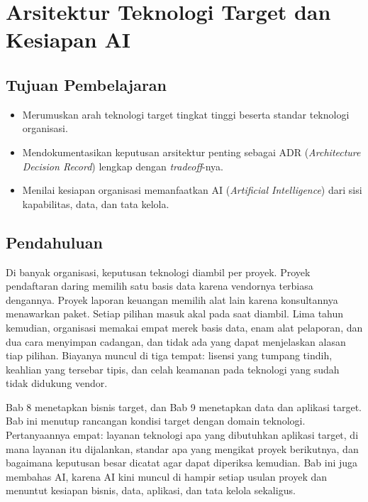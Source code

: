 \chapter{Arsitektur Teknologi Target dan Kesiapan AI}

\section*{Tujuan Pembelajaran}
\begin{itemize}
  \item Merumuskan arah teknologi target tingkat tinggi beserta standar teknologi organisasi.
  \item Mendokumentasikan keputusan arsitektur penting sebagai ADR (\textit{Architecture Decision Record}) lengkap dengan \textit{tradeoff}-nya.
  \item Menilai kesiapan organisasi memanfaatkan AI (\textit{Artificial Intelligence}) dari sisi kapabilitas, data, dan tata kelola.
\end{itemize}

\section{Pendahuluan}

Di banyak organisasi, keputusan teknologi diambil per proyek. Proyek
pendaftaran daring memilih satu basis data karena vendornya terbiasa
dengannya. Proyek laporan keuangan memilih alat lain karena konsultannya
menawarkan paket. Setiap pilihan masuk akal pada saat diambil. Lima tahun
kemudian, organisasi memakai empat merek basis data, enam alat pelaporan, dan
dua cara menyimpan cadangan, dan tidak ada yang dapat menjelaskan alasan tiap
pilihan. Biayanya muncul di tiga tempat: lisensi yang tumpang tindih,
keahlian yang tersebar tipis, dan celah keamanan pada teknologi yang sudah
tidak didukung vendor.

Bab 8 menetapkan bisnis target, dan Bab 9 menetapkan data dan aplikasi
target. Bab ini menutup rancangan kondisi target dengan domain teknologi.
Pertanyaannya empat: layanan teknologi apa yang dibutuhkan aplikasi target, di
mana layanan itu dijalankan, standar apa yang mengikat proyek berikutnya, dan
bagaimana keputusan besar dicatat agar dapat diperiksa kemudian. Bab ini juga
membahas AI, karena AI kini muncul di hampir setiap usulan proyek dan
menuntut kesiapan bisnis, data, aplikasi, dan tata kelola sekaligus.

